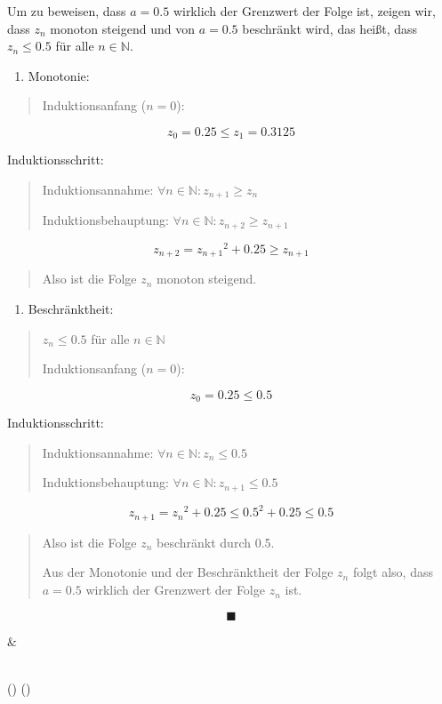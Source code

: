 \documentclass[a4paper, 12pt]{book}
\begin{document}
\begin{longtable}[]
\begin{minipage}[b]{\linewidth}
Um zu beweisen, dass \(a = 0.5\) wirklich der Grenzwert der Folge
ist, zeigen wir, dass \(z_{n}\) monoton steigend und von \(a = 0.5\)
beschränkt wird, das heißt, dass \(z_{n} \leq 0.5\) für alle
\(n\mathbb{ \in N}\).

\begin{enumerate}
\def\labelenumi{\arabic{enumi})}
\item
  Monotonie:
\end{enumerate}

\begin{quote}
Induktionsanfang (\(n = 0\)):
\end{quote}

\[z_{0} = 0.25 \leq z_{1} = 0.3125\]

Induktionsschritt:

\begin{quote}
Induktionsannahme: \(\forall n \in \mathbb{N:}z_{n + 1} \geq z_{n}\)

Induktionsbehauptung:
\(\forall n \in \mathbb{N:}z_{n + 2} \geq z_{n + 1}\)
\end{quote}

\[z_{n + 2} = {z_{n + 1}}^{2} + 0.25 \geq z_{n + 1}\]

\begin{quote}
Also ist die Folge \(z_{n}\) monoton steigend.
\end{quote}

\begin{enumerate}
\def\labelenumi{\arabic{enumi})}
\setcounter{enumi}{1}
\item
  Beschränktheit:
\end{enumerate}

\begin{quote}
\(z_{n} \leq 0.5\) für alle \(n\mathbb{ \in N}\)

Induktionsanfang (\(n = 0\)):
\end{quote}

\[z_{0} = 0.25 \leq 0.5\]

Induktionsschritt:

\begin{quote}
Induktionsannahme: \(\forall n \in \mathbb{N:}z_{n} \leq 0.5\)

Induktionsbehauptung:
\(\forall n \in \mathbb{N:}z_{n + 1} \leq 0.5\)
\end{quote}

\[z_{n + 1} = {z_{n}}^{2} + 0.25 \leq {0.5}^{2} + 0.25 \leq 0.5\]

\begin{quote}
Also ist die Folge \(z_{n}\) beschränkt durch 0.5.

Aus der Monotonie und der Beschränktheit der Folge \(z_{n}\) folgt also,
dass \(a = 0.5\) wirklich der Grenzwert der Folge \(z_{n}\) ist.
\end{quote}

\[\blacksquare\]
\end{minipage} & \begin{minipage}[b]{\linewidth}\raggedright
\end{minipage} \\
\midrule()
\endhead
\bottomrule()
\end{longtable}
\end{document}
